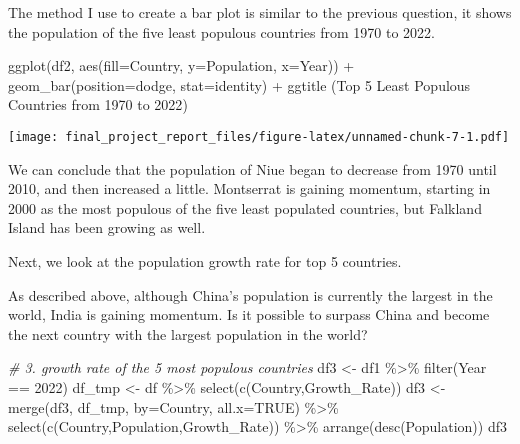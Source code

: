\documentclass[
]{article}
\newenvironment{Shaded}{\begin{snugshade}}{\end{snugshade}}
\newcommand{\AttributeTok}[1]{\textcolor[rgb]{0.77,0.63,0.00}{#1}}
\newcommand{\CommentTok}[1]{\textcolor[rgb]{0.56,0.35,0.01}{\textit{#1}}}
\newcommand{\ConstantTok}[1]{\textcolor[rgb]{0.00,0.00,0.00}{#1}}
\newcommand{\DecValTok}[1]{\textcolor[rgb]{0.00,0.00,0.81}{#1}}
\newcommand{\FunctionTok}[1]{\textcolor[rgb]{0.00,0.00,0.00}{#1}}
\newcommand{\NormalTok}[1]{#1}
\newcommand{\OtherTok}[1]{\textcolor[rgb]{0.56,0.35,0.01}{#1}}
\newcommand{\SpecialCharTok}[1]{\textcolor[rgb]{0.00,0.00,0.00}{#1}}
\newcommand{\StringTok}[1]{\textcolor[rgb]{0.31,0.60,0.02}{#1}}
\begin{document}
The method I use to create a bar plot is similar to the previous
question, it shows the population of the five least populous countries
from 1970 to 2022.

\begin{Shaded}
\begin{Highlighting}[]
\FunctionTok{ggplot}\NormalTok{(df2, }\FunctionTok{aes}\NormalTok{(}\AttributeTok{fill=}\NormalTok{Country, }\AttributeTok{y=}\NormalTok{Population, }\AttributeTok{x=}\NormalTok{Year)) }\SpecialCharTok{+} 
  \FunctionTok{geom\_bar}\NormalTok{(}\AttributeTok{position=}\StringTok{\textquotesingle{}dodge\textquotesingle{}}\NormalTok{, }\AttributeTok{stat=}\StringTok{\textquotesingle{}identity\textquotesingle{}}\NormalTok{) }\SpecialCharTok{+}
  \FunctionTok{ggtitle}\NormalTok{ (}\StringTok{\textquotesingle{}Top 5 Least Populous Countries from 1970 to 2022\textquotesingle{}}\NormalTok{)}
\end{Highlighting}
\end{Shaded}

\texttt{[image: final\_project\_report\_files/figure-latex/unnamed-chunk-7-1.pdf]}

We can conclude that the population of Niue began to decrease from 1970
until 2010, and then increased a little. Montserrat is gaining momentum,
starting in 2000 as the most populous of the five least populated
countries, but Falkland Island has been growing as well.

Next, we look at the population growth rate for top 5 countries.

As described above, although China's population is currently the largest
in the world, India is gaining momentum. Is it possible to surpass China
and become the next country with the largest population in the world?

\begin{Shaded}
\begin{Highlighting}[]
\CommentTok{\# 3. growth rate of the 5 most populous countries}
\NormalTok{df3 }\OtherTok{\textless{}{-}}\NormalTok{ df1 }\SpecialCharTok{\%\textgreater{}\%} \FunctionTok{filter}\NormalTok{(Year }\SpecialCharTok{==} \DecValTok{2022}\NormalTok{)}
\NormalTok{df\_tmp }\OtherTok{\textless{}{-}}\NormalTok{ df }\SpecialCharTok{\%\textgreater{}\%} \FunctionTok{select}\NormalTok{(}\FunctionTok{c}\NormalTok{(}\StringTok{\textquotesingle{}Country\textquotesingle{}}\NormalTok{,}\StringTok{\textquotesingle{}Growth\_Rate\textquotesingle{}}\NormalTok{))}
\NormalTok{df3 }\OtherTok{\textless{}{-}} \FunctionTok{merge}\NormalTok{(df3, df\_tmp, }\AttributeTok{by=}\StringTok{\textquotesingle{}Country\textquotesingle{}}\NormalTok{, }\AttributeTok{all.x=}\ConstantTok{TRUE}\NormalTok{) }\SpecialCharTok{\%\textgreater{}\%}
  \FunctionTok{select}\NormalTok{(}\FunctionTok{c}\NormalTok{(}\StringTok{\textquotesingle{}Country\textquotesingle{}}\NormalTok{,}\StringTok{\textquotesingle{}Population\textquotesingle{}}\NormalTok{,}\StringTok{\textquotesingle{}Growth\_Rate\textquotesingle{}}\NormalTok{)) }\SpecialCharTok{\%\textgreater{}\%} \FunctionTok{arrange}\NormalTok{(}\FunctionTok{desc}\NormalTok{(Population))}
\NormalTok{df3}
\end{Highlighting}
\end{Shaded}
\end{document}
